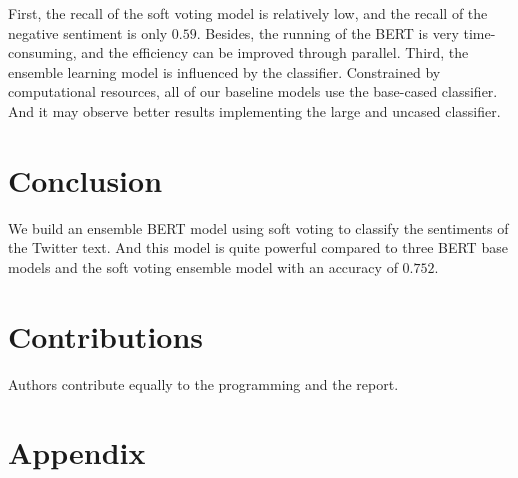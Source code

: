 \documentclass[runningheads]{llncs}
\begin{document}
First, the recall of the soft voting model is relatively low, and the recall of the negative sentiment is only $0.59$. Besides, the running of the BERT is very time-consuming, and the efficiency can be improved through parallel. Third, the ensemble learning model is influenced by the classifier. Constrained by computational resources, all of our baseline models use the base-cased classifier. And it may observe better results implementing the large and uncased classifier.


\section{Conclusion}
We build an ensemble BERT model using soft voting to classify the sentiments of the Twitter text. And this model is quite powerful compared to three BERT base models and the soft voting ensemble model with an accuracy of $0.752$.
 
 
\section{Contributions}
Authors contribute equally to the programming and the report.

%
%


%

\section*{Appendix}
\end{document}
